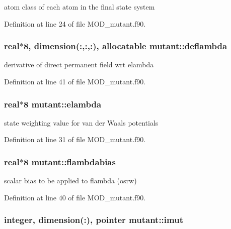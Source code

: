 atom class of each atom in the final state system 



Definition at line 24 of file M\-O\-D\-\_\-mutant.\-f90.

\hypertarget{classmutant_a649a0a7d93f9794e9bcd1ce69926cef9}{
\subsubsection[{deflambda}]{\setlength{\rightskip}{0pt plus 5cm}real$\ast$8, dimension(\-:,\-:,\-:), allocatable mutant\-::deflambda}}\label{classmutant_a649a0a7d93f9794e9bcd1ce69926cef9}


derivative of direct permanent field wrt elambda 



Definition at line 41 of file M\-O\-D\-\_\-mutant.\-f90.

\hypertarget{classmutant_a2ff148e7bea3c2bd798ac5b5d1b82077}{
\subsubsection[{elambda}]{\setlength{\rightskip}{0pt plus 5cm}real$\ast$8 mutant\-::elambda}}\label{classmutant_a2ff148e7bea3c2bd798ac5b5d1b82077}


state weighting value for van der Waals potentials 



Definition at line 31 of file M\-O\-D\-\_\-mutant.\-f90.

\hypertarget{classmutant_a5497c64fcddcac4e3da0f8aca807d3ed}{
\subsubsection[{flambdabias}]{\setlength{\rightskip}{0pt plus 5cm}real$\ast$8 mutant\-::flambdabias}}\label{classmutant_a5497c64fcddcac4e3da0f8aca807d3ed}


scalar bias to be applied to flambda (osrw) 



Definition at line 40 of file M\-O\-D\-\_\-mutant.\-f90.

\hypertarget{classmutant_a4757b139279f9001d6119ef90302f77e}{
\subsubsection[{imut}]{\setlength{\rightskip}{0pt plus 5cm}integer, dimension(\-:), pointer mutant\-::imut}}\label{classmutant_a4757b139279f9001d6119ef90302f77e}


